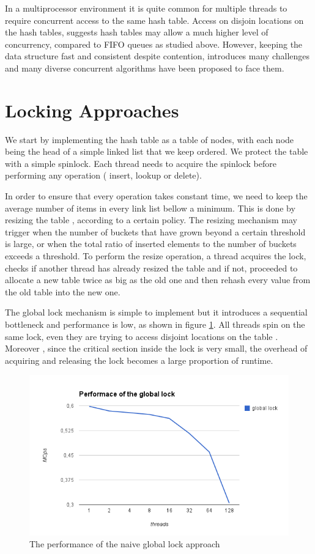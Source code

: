 In a multiprocessor environment it is quite common for multiple threads to require concurrent access to the same hash table. Access on disjoin locations on the hash tables, suggests hash tables may allow a much higher level of concurrency, compared to FIFO queues as studied above. However, keeping the data structure fast and consistent despite contention, introduces many challenges and many diverse concurrent algorithms have been proposed to face them.
   

\section{ Locking Approaches}

We start by implementing the hash table as a table of nodes, with each node being the head of a simple linked list that we keep ordered. We protect the table with a simple spinlock. Each thread needs to acquire the spinlock before performing any operation ( insert, lookup or delete). 

In order to ensure that every operation takes constant time, we need to keep the average number of items in every link list bellow a minimum. This is done by resizing the table , according to a certain policy. The resizing mechanism may trigger when the number of buckets that have grown beyond a certain threshold is large, or when the total ratio of inserted elements to the number of buckets exceeds a threshold. To perform the resize operation, a thread acquires the lock, checks if another thread has already resized the table and if not, proceeded to allocate a new table twice as big as the old one and then rehash every value from the old table into the new one.

The global lock mechanism is simple to implement but it introduces a sequential bottleneck and performance is low, as shown in figure \ref{hashes_global_perf}. All threads spin on the same lock, even they are trying to access disjoint locations on the table . Moreover , since the critical section inside the lock is very small, the overhead of acquiring and releasing the lock becomes a large proportion of runtime.

\begin{figure}
 \centering
  \includegraphics[scale=0.7]{hashes_global_perf.png}
\caption{The performance of the naive global lock approach}
\label{hashes_global_perf}
\end{figure}

